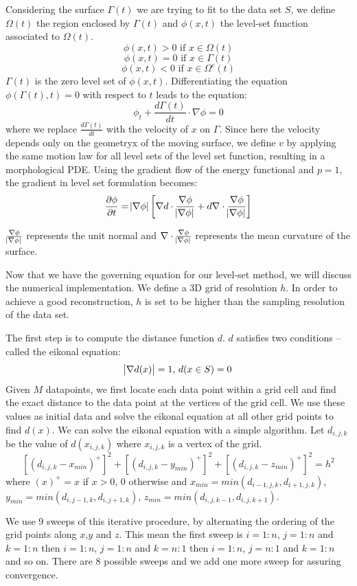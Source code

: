 \documentclass[12pt]{article}
\begin{document}
Considering the surface $\Gamma(t)$ we are trying to fit to the data set $S$, we define $\Omega(t)$ the region enclosed by $\Gamma(t)$ and $\phi(x,t)$ the level-set function associated to $\Omega(t)$.
$$\phi(x,t) > 0\text{ if } x\in\Omega(t)$$
$$\phi(x,t) = 0\text{ if } x\in\Gamma(t)$$
$$\phi(x,t) < 0\text{ if } x\in\Omega^c(t)$$
$\Gamma(t)$ is the zero level set of $\phi(x,t)$. Differentiating the equation $\phi(\Gamma(t),t) = 0$ with respect to $t$ leads to the equation:
$$\phi_t + \frac{d\Gamma(t)}{dt}\cdot\nabla\phi = 0$$
where we replace $\frac{d\Gamma(t)}{dt}$ with the velocity of $x$ on $\Gamma$. Since here the velocity depends only on the geometryx of the moving surface, we define $v$ by applying the same motion law for all level sets of the level set function, resulting in a morphological PDE. Using the gradient flow of the energy functional and $p = 1$, the gradient in level set formulation becomes:
$$\frac{\partial\phi}{\partial t} = \abs{\nabla\phi}\left[\nabla d \cdot \frac{\nabla\phi}{\abs{\nabla\phi}} + d\nabla\cdot\frac{\nabla\phi}{\abs{\nabla\phi}}\right]$$

$\frac{\nabla\phi}{\abs{\nabla\phi}}$ represents the unit normal and $\nabla\cdot\frac{\nabla\phi}{\abs{\nabla\phi}}$ represents the mean curvature of the surface.

Now that we have the governing equation for our level-set method, we will discuss the numerical implementation. We define a 3D grid of resolution $h$. In order to achieve a good reconstruction, $h$ is set to be higher than the sampling resolution of the data set.

The first step is to compute the distance function $d$. $d$ satisfies two conditions -- called the eikonal equation:
$$\abs{\nabla d(x)} = 1\text{, }d(x\in S) = 0$$
Given $M$ datapoints, we first locate each data point within a grid cell and find the exact distance to the data point at the vertices of the grid cell. We use these values as initial data and solve the eikonal equation at all other grid points to find $d(x)$. We can solve the eikonal equation with a simple algorithm. Let $d_{i,j,k}$ be the value of $d(x_{i,j,k})$ where $x_{i,j,k}$ is a vertex of the grid.
$$[(d_{i,j,k} - x_{min})^+]^2 + [(d_{i,j,k} - y_{min})^+]^2 + [(d_{i,j,k} - z_{min})^+]^2 = h^2$$
where $(x)^+ = x$ if $x > 0$, $0$ otherwise and $x_{min} = min(d_{i-1,j,k}, d_{i+1,j,k})$, $y_{min} = min(d_{i,j-1,k}, d_{i,j+1,k})$, $z_{min} = min(d_{i,j,k-1}, d_{i,j,k+1})$.

We use 9 sweeps of this iterative procedure, by alternating the ordering of the grid points along $x$,$y$ and $z$. This mean the first sweep is $i=1:n$, $j=1:n$ and $k=1:n$ then $i=1:n$, $j=1:n$ and $k=n:1$ then $i=1:n$, $j=n:1$ and $k=1:n$ and so on. There are 8 possible sweeps and we add one more sweep for assuring convergence.
\end{document}
